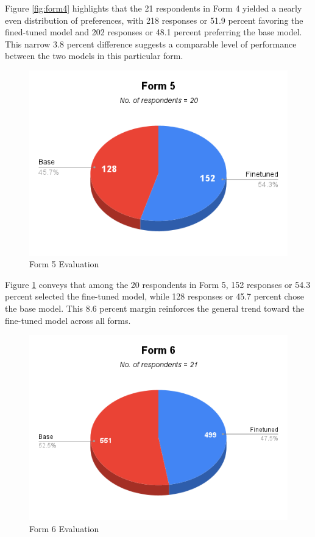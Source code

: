 Figure \ref{fig:form4} highlights that the 21 respondents in Form 4 yielded a nearly even distribution of preferences, with 218 responses or 51.9 percent favoring the fined-tuned model and 202 responses or 48.1 percent preferring the base model. This narrow 3.8 percent difference suggests a comparable level of performance between the two models in this particular form. 

\begin{figure}[htbp]
	\centering
	\includegraphics[scale=0.7]{figures/Form5.png}
	\caption{Form 5 Evaluation}
	\label{fig:form5}	
\end{figure}

Figure \ref{fig:form5} conveys that among the 20 respondents in Form 5, 152 responses or 54.3 percent selected the fine-tuned model, while 128 responses or 45.7 percent chose the base model. This 8.6 percent margin reinforces the general trend toward the fine-tuned model across all forms.

\begin{figure}[htbp]
	\centering
	\includegraphics[scale=0.7]{figures/Form 6.png}
	\caption{Form 6 Evaluation}
	\label{fig:form6}	
\end{figure}

